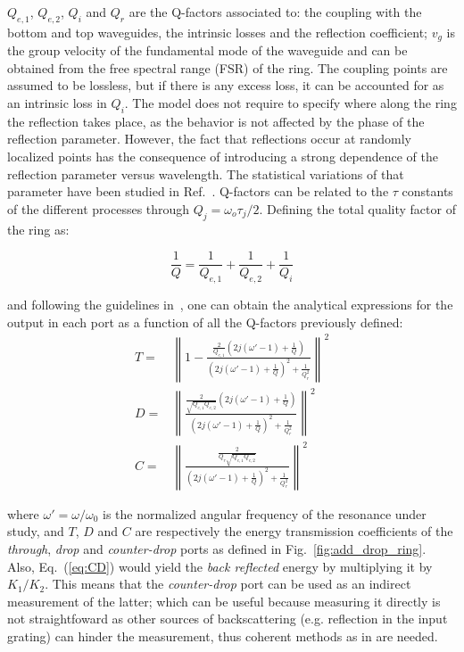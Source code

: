 $Q_{e,1}$, $Q_{e,2}$, $Q_{i}$ and $Q_{r}$ are the Q-factors associated to: the coupling with the bottom and top waveguides, the intrinsic losses and the reflection coefficient; $v_g$ is the group velocity of the fundamental mode of the waveguide and can be obtained from the free spectral range (FSR) of the ring. The coupling points are assumed to be lossless, but if there is any excess loss, it can be accounted for as an intrinsic loss in $Q_i$. The model does not require to specify where along the ring the reflection takes place, as the behavior is not affected by the phase of the reflection parameter. However, the fact that reflections occur at randomly localized points has the consequence of introducing a strong dependence of the reflection parameter versus wavelength. The statistical variations of that parameter have been studied in Ref.~\cite{Morichetti2010}. Q-factors can be related to the $\tau$ constants of the different processes through $Q_j=\omega_o \tau_j/2$. Defining the total quality factor of the ring as:

\begin{equation}
	    \frac{1}{Q}=\frac{1}{Q_{e,1}}+\frac{1}{Q_{e,2}}+\frac{1}{Q_i}
\label{eq:Q_def}
\end{equation}

and following the guidelines in~\cite{Haus1984,Little1997,Zhang2008}, one can obtain the analytical expressions for the output in each port as a function of all the Q-factors previously defined:
\begin{subequations}
\label{eq:ports}
\begin{align}
	T=& \left\lVert1-\frac{        \frac{2}{Q_{e,1}}(2j(\omega '-1)+\frac{1}{Q})   }  {   (2j(\omega '-1)+\frac{1}{Q})^2+\frac{1}{Q_r^2}  }\right\rVert^2 \label{eq:T} \\
	D =& \left\lVert\frac{          \frac{2}{\sqrt{Q_{e,1}Q_{e,2}}}(2j(\omega '-1)+\frac{1}{Q})   }  {   (2j(\omega'-1)+\frac{1}{Q})^2+\frac{1}{Q_r^2}    }\right\rVert^2 \label{eq:D} \\
	C=& \left\lVert\frac{          \frac{2}{Q_r\sqrt{Q_{e,1}Q_{e,2}}}   }  {   (2j(\omega'-1)+\frac{1}{Q})^2+\frac{1}{Q_r^2}    }\right\rVert^2 \label{eq:CD}
\end{align}
\end{subequations}

where $\omega'=\omega/\omega_0$ is the normalized angular frequency of the resonance under study, and $T$, $D$ and $C$ are respectively the energy transmission coefficients of the \emph{through}, \emph{drop} and \emph{counter-drop} ports as defined in Fig.~\ref{fig:add_drop_ring}. Also, Eq.~(\ref{eq:CD}) would yield the \emph{back reflected} energy by multiplying it by $K_1/K_2$. This means that the \emph{counter-drop} port can be used as an indirect measurement of the latter; which can be useful because measuring it directly is not straightfoward as other sources of backscattering (e.g. reflection in the input grating) can hinder the measurement, thus coherent methods as in \cite{Morichetti2010a} are needed.


